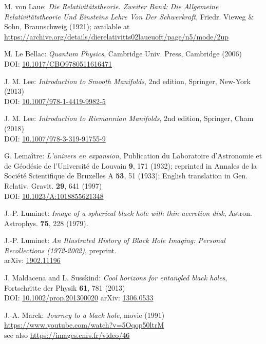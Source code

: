 \begin{thebibliography}{123}
M. von Laue: {\em Die Relativitätstheorie. Zweiter Band: Die Allgemeine Relativitätstheorie Und Einsteins Lehre Von Der Schwerkraft},
Friedr. Vieweg \& Sohn, Braunschweig (1921); available at \\
\url{https://archive.org/details/dierelativitts02laueuoft/page/n5/mode/2up}

M. Le Bellac:
{\em Quantum Physics},
Cambridge Univ. Press, Cambridge (2006)\\
DOI: \href{ https://doi.org/10.1017/CBO9780511616471}{10.1017/CBO9780511616471}

J. M. Lee: {\em Introduction to Smooth Manifolds}, 2nd edition,
Springer, New-York (2013)\\
DOI: \href{https://doi.org/10.1007/978-1-4419-9982-5}{10.1007/978-1-4419-9982-5}

J. M. Lee: {\em Introduction to Riemannian Manifolds}, 2nd edition,
Springer, Cham (2018)\\
DOI: \href{https://doi.org/10.1007/978-3-319-91755-9}{10.1007/978-3-319-91755-9}

G. Lemaître: {\em L'univers en expansion},
Publication du Laboratoire d'Astronomie et de Géodésie de l'Université
de Louvain {\bf 9},  171 (1932); reprinted in
Annales de la Société Scientifique de Bruxelles A {\bf 53}, 51 (1933);
English translation in
Gen. Relativ. Gravit. {\bf 29}, 641 (1997)\\
DOI: \href{https://doi.org/10.1023/A:1018855621348}{10.1023/A:1018855621348}

J.-P. Luminet: {\em Image of a spherical black hole with thin accretion disk},
Astron. Astrophys. {\bf 75}, 228 (1979).

J.-P. Luminet:
{\em An Illustrated History of Black Hole Imaging: Personal Recollections (1972-2002)}, preprint.\\
arXiv: \href{https://arxiv.org/abs/1902.11196}{1902.11196}

J. Maldacena and L. Susskind:
{\em Cool horizons for entangled black holes},
Fortschritte der Physik {\bf 61}, 781 (2013)\\
DOI: \href{https://doi.org/10.1002/prop.201300020}{10.1002/prop.201300020}\hfill
arXiv: \href{https://arxiv.org/abs/1306.0533}{1306.0533}

J.-A. Marck:
{\em Journey to a black hole}, movie (1991)\\
\url{https://www.youtube.com/watch?v=5Oqop50ltrM}\\
see also \url{https://images.cnrs.fr/video/46}


\end{thebibliography}
